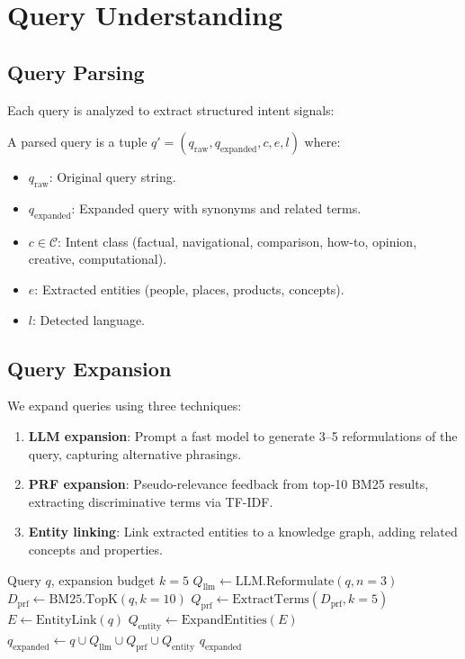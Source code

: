 \section{Query Understanding}

\label{sec:query}

\subsection{Query Parsing}

Each query is analyzed to extract structured intent signals:

\begin{definition}
A parsed query is a tuple $q' = (q_{\text{raw}}, q_{\text{expanded}}, c, e, l)$ where:
\begin{itemize}[leftmargin=1.1em]
    \item $q_{\text{raw}}$: Original query string.
    \item $q_{\text{expanded}}$: Expanded query with synonyms and related terms.
    \item $c \in \mathcal{C}$: Intent class (factual, navigational, comparison, how-to, opinion, creative, computational).
    \item $e$: Extracted entities (people, places, products, concepts).
    \item $l$: Detected language.
\end{itemize}
\end{definition}

\subsection{Query Expansion}

We expand queries using three techniques:

\begin{enumerate}[leftmargin=1.4em]
    \item \textbf{LLM expansion}: Prompt a fast model to generate 3--5 reformulations of the query, capturing alternative phrasings.
    \item \textbf{PRF expansion}: Pseudo-relevance feedback from top-10 BM25 results, extracting discriminative terms via TF-IDF.
    \item \textbf{Entity linking}: Link extracted entities to a knowledge graph, adding related concepts and properties.
\end{enumerate}

\begin{algorithm}[H]
\caption{Multi-Strategy Query Expansion}
\label{alg:expansion}
\begin{algorithmic}[1]
\Require Query $q$, expansion budget $k = 5$
\State $Q_{\text{llm}} \gets \text{LLM.Reformulate}(q, n=3)$
\State $D_{\text{prf}} \gets \text{BM25.TopK}(q, k=10)$
\State $Q_{\text{prf}} \gets \text{ExtractTerms}(D_{\text{prf}}, k=5)$
\State $E \gets \text{EntityLink}(q)$
\State $Q_{\text{entity}} \gets \text{ExpandEntities}(E)$
\State $q_{\text{expanded}} \gets q \cup Q_{\text{llm}} \cup Q_{\text{prf}} \cup Q_{\text{entity}}$
\State \Return $q_{\text{expanded}}$
\end{algorithmic}
\end{algorithm}

